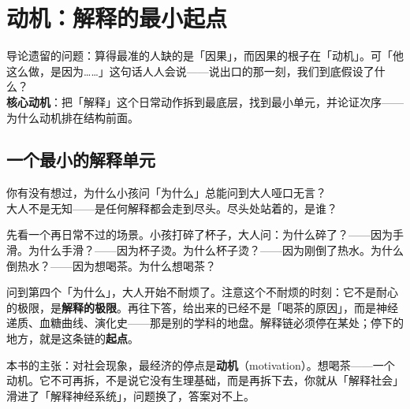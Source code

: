 \documentclass[../../main2.tex]{subfiles}
\begin{document}
\chapter{动机：解释的最小起点}
\label{ch:motivation}

\begin{motivation}
	导论遗留的问题：算得最准的人缺的是「因果」，而因果的根子在「动机」。可「他这么做，是因为……」这句话人人会说——说出口的那一刻，我们到底假设了什么？\\
	\textbf{核心动机}：把「解释」这个日常动作拆到最底层，找到最小单元，并论证次序——为什么动机排在结构前面。
\end{motivation}

\begin{logicmap}
\end{logicmap}

\section{一个最小的解释单元}

\begin{readingnote}
	你有没有想过，为什么小孩问「为什么」总能问到大人哑口无言？\\
	大人不是无知——是任何解释都会走到尽头。尽头处站着的，是谁？
\end{readingnote}

先看一个再日常不过的场景。小孩打碎了杯子，大人问：为什么碎了？——因为手滑。为什么手滑？——因为杯子烫。为什么杯子烫？——因为刚倒了热水。为什么倒热水？——因为想喝茶。为什么想喝茶？

问到第四个「为什么」，大人开始不耐烦了。注意这个不耐烦的时刻：它不是耐心的极限，是\textbf{解释的极限}。再往下答，给出来的已经不是「喝茶的原因」，而是神经递质、血糖曲线、演化史——那是别的学科的地盘。解释链必须停在某处；停下的地方，就是这条链的\textbf{起点}。

本书的主张：对社会现象，最经济的停点是\textbf{动机}（motivation）。想喝茶——一个动机。它不可再拆，不是说它没有生理基础，而是再拆下去，你就从「解释社会」滑进了「解释神经系统」，问题换了，答案对不上。
\end{document}
